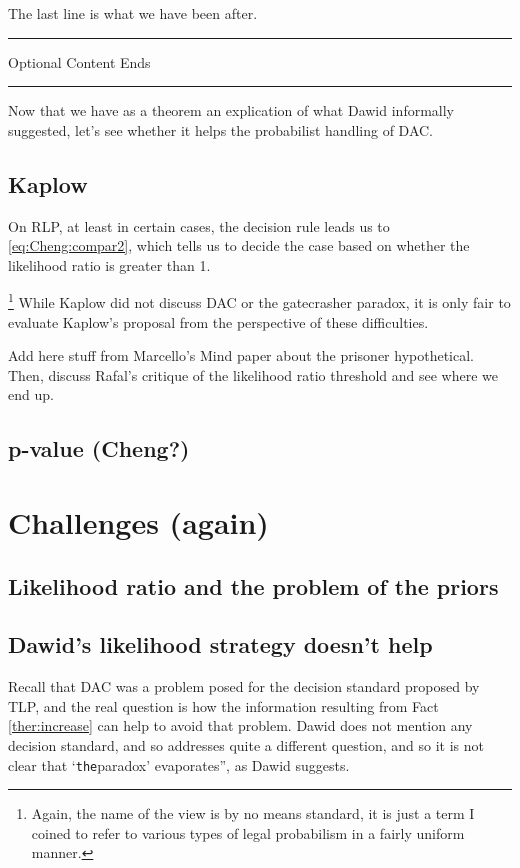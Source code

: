 \documentclass[10pt,dvipsnames,enabledeprecatedfontcommands]{scrartcl}
\newcommand{\intermezzob}{\nopagebreak 
	\begin{minipage}[c]{13cm}
	\begin{center}\rule{10cm}{0.4pt}

	\tiny{\sc Optional Content Ends}
	
	\vspace{-1mm}
	
	\rule{10cm}{0.4pt}\end{center}
	\end{minipage}
	}
\begin{document}
\vspace{1mm}

The last line is what we have been after.

\intermezzob

Now that we have as a theorem an explication of what Dawid informally
suggested, let's see whether it helps the probabilist handling of DAC.

\subsection{Kaplow}\label{kaplow}

On RLP, at least in certain cases, the decision rule leads us to
\eqref{eq:Cheng:compar2}, which tells us to decide the case based on
whether the likelihood ratio is greater than 1.

\footnote{Again, the name of the view is by no means standard, it is  just a term I coined to refer to various types of legal probabilism in a fairly uniform manner.}
While Kaplow did not discuss DAC or the gatecrasher paradox, it is only
fair to evaluate Kaplow's proposal from the perspective of these
difficulties.

Add here stuff from Marcello's Mind paper about the prisoner
hypothetical. Then, discuss Rafal's critique of the likelihood ratio
threshold and see where we end up.

\subsection{p-value (Cheng?)}\label{p-value-cheng}

\section{Challenges (again)}\label{challenges-again}

\subsection{Likelihood ratio and the problem of the
priors}\label{likelihood-ratio-and-the-problem-of-the-priors}

\subsection{Dawid's likelihood strategy doesn't
help}\label{dawids-likelihood-strategy-doesnt-help}

Recall that DAC was a problem posed for the decision standard proposed
by TLP, and the real question is how the information resulting from Fact
\ref{ther:increase} can help to avoid that problem. Dawid does not
mention any decision standard, and so addresses quite a different
question, and so it is not clear that `\texttt{the}paradox'
evaporates'', as Dawid suggests.
\end{document}
